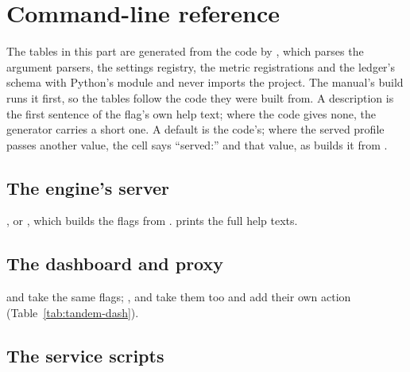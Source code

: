 \chapter{Command-line reference}\label{ch:ref-cli}

The tables in this part are generated from the code by , which parses the argument parsers, the settings registry, the metric registrations and the ledger's schema with Python's  module and never imports the project. The manual's build runs it first, so the tables follow the code they were built from. A description is the first sentence of the flag's own help text; where the code gives none, the generator carries a short one. A default is the code's; where the served profile passes another value, the cell says \enquote{served:} and that value, as  builds it from .

\section{The engine's server}

, or , which builds the flags from .  prints the full help texts.



\section{The dashboard and proxy}

 and  take the same flags; ,  and  take them too and add their own action (Table~\ref{tab:tandem-dash}).







\section{The service scripts}

